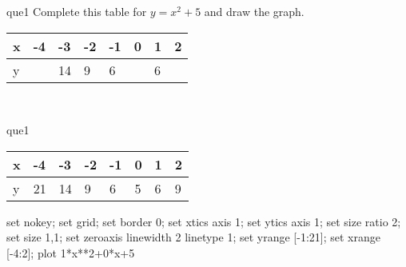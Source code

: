 \documentclass[13.5pt, varwidth=true]{beamer}
\begin{document}
\begin{frame}[shrink=19,fragile]
	\begin{beamercolorbox}[rounded=true, left, shadow=true,wd=14.8cm]{que1}
		 Complete this table for $y = x^{2} + 5$ and draw the graph. \\[0.3cm] \renewcommand{\arraystretch}{1.2}\begin{tabular}{|C|C|C|C|C|C|C|C|} \hline x & -4 & -3 & -2 & -1 & 0 & 1 & 2 \\ \hline y &  & 14 & 9 & 6 &  & 6 & \\ \hline \end{tabular}\\[0.3cm]
	\end{beamercolorbox}
\end{frame}
\begin{frame}[shrink=19,fragile]
	\begin{beamercolorbox}[rounded=true, left, shadow=true,wd=14.8cm]{que1}
		\renewcommand{\arraystretch}{1.2}\begin{tabular}{|C|C|C|C|C|C|C|C|} \hline x & -4 & -3 & -2 & -1 & 0 & 1 & 2 \\ \hline y & 21 & 14 & 9 & 6 & 5 & 6 & 9\\ \hline \end{tabular}\begin{gnuplot}[terminal=pdf] set nokey; set grid; set border 0; set xtics axis 1; set ytics axis 1; set size ratio 2; set size 1,1; set zeroaxis linewidth 2 linetype 1; set yrange [-1:21]; set xrange [-4:2]; plot 1*x**2+0*x+5 \end{gnuplot}
	\end{beamercolorbox}
\end{frame}
\end{document}

